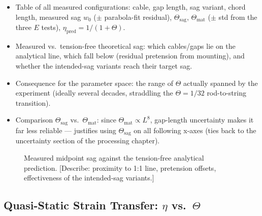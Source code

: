 \begin{itemize}
  \item Table of all measured configurations: cable, gap length, sag variant,
    chord length, measured sag $w_0$ ($\pm$ parabola-fit residual),
    $\Theta_\mathrm{sag}$, $\Theta_\mathrm{mat}$ ($\pm$ std from the three
    $E$ tests), $\eta_\mathrm{pred} = 1/(1+\Theta)$.
  \item Measured vs.\ tension-free theoretical sag: which cables/gaps lie on
    the analytical line, which fall below (residual pretension from
    mounting), and whether the intended-sag variants reach their target sag.
  \item Consequence for the parameter space: the range of $\Theta$ actually
    spanned by the experiment (ideally several decades, straddling the
    $\Theta = 1/32$ rod-to-string transition).
  \item Comparison $\Theta_\mathrm{sag}$ vs.\ $\Theta_\mathrm{mat}$: since
    $\Theta_\mathrm{mat} \propto L^8$, gap-length uncertainty makes it far
    less reliable — justifies using $\Theta_\mathrm{sag}$ on all following
    x-axes (ties back to the uncertainty section of the processing chapter).
\end{itemize}

\begin{figure}[htb]
  \centering
  \caption{Measured midpoint sag against the tension-free analytical
    prediction. [Describe: proximity to 1:1 line, pretension offsets,
    effectiveness of the intended-sag variants.]}
  \label{fig:res:sag}
\end{figure}


\subsection{Quasi-Static Strain Transfer: $\eta$ vs.\ $\Theta$}
\label{sec:res:etatheta}

